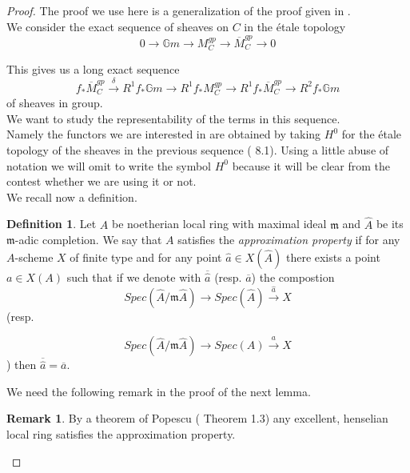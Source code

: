 \documentclass{amsart}
\theoremstyle{definition}
\newtheorem{definition}[thm]{Definition}
\newtheorem{rmk}[thm]{Remark}
\numberwithin{equation}{section}
\begin{document}
\begin{proof}
The proof we use here is a generalization of the proof given in \cite{b14}.\\
We consider the exact sequence of sheaves on $C$ in the \'etale topology
$$
0{\rightarrow}{\mathbb{G}m}{\rightarrow} M_C^{gp}{\rightarrow} \overline{M}_C^{gp}{\rightarrow} 0
$$

\noindent This gives us a long exact sequence
\begin{equation}\label{longexactseq}
f_{*}\overline{M}_{C}^{gp}\stackrel{\delta}{\rightarrow} R^1f_{*}{\mathbb{G}m}{\rightarrow} R^1f_{*}M_{C}^{gp}{\rightarrow} R^{1}f_{*}\overline{M}_{C}^{gp}{\rightarrow} R^2f_{*}{\mathbb{G}m}
\end{equation}
\noindent of sheaves in group. \\ We want to study the representability of the terms in this sequence.\\
Namely the functors we are interested in are obtained by taking $H^0$ for the \'etale topology of the sheaves in the previous sequence (\cite{blr} 8.1). Using a little abuse of notation we will omit to write the symbol $H^0$ because it will be clear from the contest whether we are using it or not.\\
We recall now a definition.
\begin{definition}
  Let $A$ be noetherian local ring with maximal ideal ${\mathfrak{m}}$ and $\hat{A}$ be its ${\mathfrak{m}}$-adic completion. We say that $A$ satisfies the \emph{approximation property} if for any $A$-scheme $X$ of finite type and for any point $\hat{a}\in X(\hat{A})$ there exists a point $a\in X(A)$ such that if we denote with $\overline{\hat{a}}$ (resp. $\overline{a}$) the compostion 
  $$
  Spec(\hat{A}/{\mathfrak{m}}\hat{A}){\rightarrow} Spec(\hat{A})\stackrel{\hat{a}}{\rightarrow} X
  $$
\noindent (resp. 

$$
Spec(\hat{A}/{\mathfrak{m}}\hat{A}){\rightarrow} Spec(A)\stackrel{a}{\rightarrow} X
$$
\noindent ) then $\overline{\hat{a}}=\overline{a}$.\\
\end{definition}
We need the following remark in the proof of the next lemma.
\begin{rmk}\label{pope} By a theorem of Popescu (\cite{popescu} Theorem 1.3) any excellent, henselian local ring satisfies the approximation property.
\end{rmk}


\end{proof}
\end{document}
